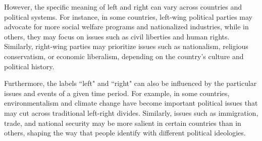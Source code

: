 However, the specific meaning of left and right can vary across countries and political systems.
For instance, in some countries, left-wing political parties may advocate for more social welfare programs and nationalized industries, while in others, they may focus on issues such as civil liberties and human rights.
Similarly, right-wing parties may prioritize issues such as nationalism, religious conservatism, or economic liberalism, depending on the country's culture and political history.

Furthermore, the labels ``left" and ``right" can also be influenced by the particular issues and events of a given time period.
For example, in some countries, environmentalism and climate change have become important political issues that may cut across traditional left-right divides.
Similarly, issues such as immigration, trade, and national security may be more salient in certain countries than in others, shaping the way that people identify with different political ideologies.







\begin{table}[ht]
    \centering
    \caption{Example of Left and Right positions according to AllSides}
    \label{tab:allsides_leaning_positions}
\end{table}

